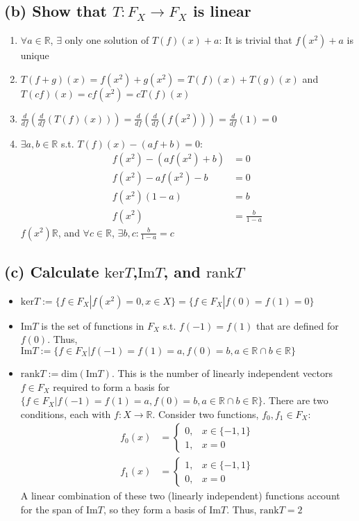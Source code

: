 \documentclass{article}
\newcommand{\R}{\mathbb{R}}
\begin{document}
\subsection*{(b) Show that $T:F_X\rightarrow F_X$ is linear}
\begin{enumerate}
	\item $\forall a\in\R$, $\exists$ only one solution of $T(f)(x)+a$: It is trivial that $f(x^2)+a$ is unique
	
	\item $T(f+g)(x)=f(x^2)+g(x^2)=T(f)(x)+T(g)(x)$ and $T(cf)(x)=c f(x^2)=cT(f)(x)$
	
	\item $\frac{d}{df}\left(\frac{d}{df}\left( T(f)(x) \right)\right)=\frac{d}{df}\left(\frac{d}{df}\left( f(x^2) \right)\right)=\frac{d}{df}\left( 1 \right) = 0$
	
	\item $\exists a,b\in\R$ s.t. $T(f)(x)-(af+b)=0$:
		\begin{align*}
			f(x^2) - (af(x^2)+b)	&= 0 				\\
			f(x^2)-af(x^2)-b		&= 0				\\
			f(x^2)(1-a)				&= b 				\\
			f(x^2)					&= \frac{b}{1-a}
		\end{align*}
		$f(x^2)\R$, and $\forall c\in\R$, $\exists b,c:\frac{b}{1-a}=c$
\end{enumerate}


\subsection*{(c) Calculate $\text{ker}T$,$\text{Im}T$, and $\text{rank}T$ }
\begin{itemize}
	\item $\text{ker}T:=\{f\in F_X|f(x^2)=0,x\in X\}=\{f\in F_X|f(0)=f(1)=0\}$
	
	\item $\text{Im}T$ is the set of functions in $F_X$ s.t. $f(-1)=f(1)$ that are defined for $f(0)$. Thus, $\text{Im}T:= \{f\in F_X|f(-1)=f(1)=a,f(0)=b,a\in\R\cap b\in\R\}$
	
	\item $\text{rank}T:= \text{dim}(\text{Im}T)$. This is the number of linearly independent vectors $f\in F_X$ required to form a basis for $\{f\in F_X|f(-1)=f(1)=a,f(0)=b,a\in\R\cap b\in\R\}$. There are two conditions, each with $f:X\rightarrow\R$. Consider two functions, $f_0,f_1\in F_X$:
		\begin{align*}
			f_0(x)&=\begin{cases} 0, & x\in\{-1,1\} \\ 1,&x=0\end{cases}	\\
			f_1(x)&=\begin{cases} 1, & x\in\{-1,1\} \\ 0,&x=0\end{cases}
		\end{align*}
	A linear combination of these two (linearly independent) functions account for the span of $\text{Im}T$, so they form a basis of $\text{Im}T$. Thus, $\text{rank}T=2$
\end{itemize}
\end{document}

